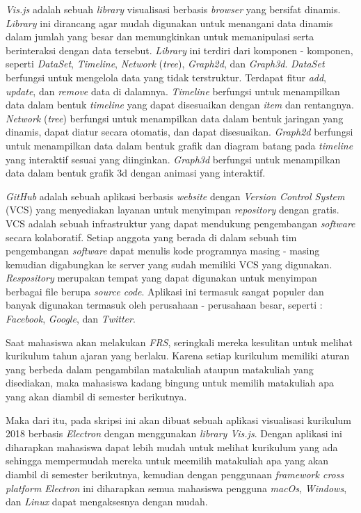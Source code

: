  \textit{Vis.js} adalah sebuah \textit{library} visualisasi berbasis \textit{browser} yang bersifat dinamis. \textit{Library} ini dirancang agar mudah digunakan untuk menangani data dinamis dalam jumlah yang besar dan memungkinkan untuk memanipulasi serta berinteraksi dengan data tersebut. \textit{Library} ini terdiri dari komponen - komponen, seperti \textit{DataSet}, \textit{Timeline}, \textit{Network} (\textit{tree}), \textit{Graph2d}, dan \textit{Graph3d}. \textit{DataSet} berfungsi untuk mengelola data yang tidak terstruktur. Terdapat fitur \textit{add}, \textit{update}, dan \textit{remove} data di dalamnya. \textit{Timeline} berfungsi untuk menampilkan data dalam bentuk \textit{timeline} yang dapat disesuaikan dengan \textit{item} dan rentangnya.  \textit{Network} (\textit{tree}) berfungsi untuk menampilkan data dalam bentuk jaringan yang dinamis, dapat diatur secara otomatis, dan dapat disesuaikan. \textit{Graph2d} berfungsi untuk menampilkan data dalam bentuk grafik dan diagram batang pada \textit{timeline} yang interaktif sesuai yang diinginkan. \textit{Graph3d} berfungsi untuk menampilkan data dalam bentuk grafik 3d dengan animasi yang interaktif. 

\textit{GitHub} adalah sebuah aplikasi berbasis \textit{website} dengan \textit{Version Control System} (VCS) yang menyediakan layanan untuk menyimpan \textit{repository} dengan gratis. VCS  adalah sebuah infrastruktur yang dapat mendukung pengembangan \textit{software} secara kolaboratif. Setiap anggota yang berada di dalam sebuah tim pengembangan \textit{software} dapat menulis kode programnya masing - masing kemudian digabungkan ke server yang sudah memiliki VCS yang digunakan. \textit{Respository} merupakan tempat yang dapat digunakan untuk menyimpan berbagai file berupa \textit{source code}. Aplikasi ini termasuk sangat populer dan banyak digunakan termasuk oleh perusahaan - perusahaan besar, seperti : \textit{Facebook}, \textit{Google}, dan \textit{Twitter}.

Saat mahasiswa akan melakukan \textit{FRS}, seringkali mereka kesulitan untuk melihat kurikulum tahun ajaran yang berlaku. Karena setiap kurikulum memiliki aturan yang berbeda dalam pengambilan matakuliah ataupun matakuliah yang disediakan, maka mahasiswa kadang bingung untuk memilih matakuliah apa yang akan diambil di semester berikutnya.

Maka dari itu, pada skripsi ini akan dibuat sebuah aplikasi visualisasi kurikulum 2018 berbasis \textit{Electron} dengan menggunakan \textit{library Vis.js}. Dengan aplikasi ini diharapkan mahasiswa dapat lebih mudah untuk melihat kurikulum yang ada sehingga mempermudah mereka untuk meemilih matakuliah apa yang akan diambil di semester berikutnya, kemudian dengan penggunaan \textit{framework cross platform Electron} ini diharapkan semua mahasiswa pengguna \textit{macOs}, \textit{Windows}, dan \textit{Linux} dapat mengaksesnya dengan mudah.

